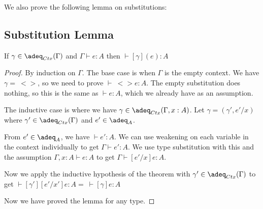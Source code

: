 We also prove the following lemma on substitutions:

\subsection{Substitution Lemma}

\begin{lem}\label{closedgamma}
If $\gamma \in \adeq_{Ctx}(\Gamma)$ and $\Gamma \vdash e : A$ then $\vdash [\gamma](e) : A$
\end{lem}

\begin{proof}
By induction on $\Gamma$. The base case is when $\Gamma$ is the empty context. We have $\gamma = \ <>$, so we need to prove $\vdash \ <>e : A$. The empty substitution does nothing, so this is the same as $\vdash e : A$, which we already have as an assumption.

The inductive case is where we have $\gamma \in \adeq_{Ctx}(\Gamma,x:A)$. Let $\gamma = (\gamma',e'/x)$ where $\gamma' \in \adeq_{Ctx}(\Gamma)$ and $e' \in  \adeq_A$. 

From $e' \in \adeq_A$, we have $\vdash e' : A$. We can use weakening on each variable in the context individually to get $\Gamma \vdash e' : A$. We use type substitution with this and the assumption $\Gamma, x:A \vdash e:A$ to get $\Gamma \vdash  [e'/x]e : A$.

Now we apply the inductive hypothesis of the theorem with $\gamma' \in \adeq_{Ctx}(\Gamma)$ to get $\vdash [\gamma'][e'/x'] e : A =  \ \vdash [\gamma]e : A$

Now we have proved the lemma for any type.
\end{proof}